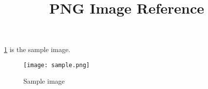 \documentclass[a4paper,11pt,oneside,openany,report]{jsbook}
\title{PNG Image Reference}
\begin{document}
\maketitle
\ref{sample.png}
is the sample image.
\begin{figure}
	\centering
	\texttt{[image: sample.png]}
	\caption{Sample image}\label{sample.png}
\end{figure}
\end{document}
